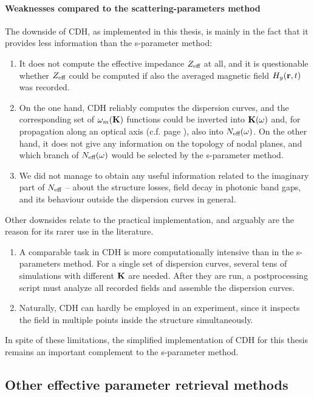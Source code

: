 \paragraph{Weaknesses compared to the scattering-parameters method}%
The downside of CDH, as implemented in this thesis, is mainly in the fact that it provides less information than the s-parameter method: 
\begin{enumerate}
\item{It does not compute the effective impedance $Z_{\text{eff} }$ at all, and it is questionable whether $Z_{\text{eff} }$ could be computed if also the averaged magnetic field $H_y({\mathbf{r}}, t)$ was recorded. } 
\item{On the one hand, CDH reliably computes the dispersion curves, and the corresponding set of $\omega_m({\mathbf{K}})$ functions could be inverted into ${\mathbf{K}}(\omega)$ and, for propagation along an optical axis (c.f. page \pageref{indexofrefraction}), also into $N_{\text{eff} }(\omega)$. On the other hand, it does not give any information on the topology of nodal planes, and which branch of $N_{\text{eff} }(\omega)$ would be selected by the s-parameter method. } 
\item{We did not manage to obtain any useful information related to the imaginary part of $N_{\text{eff} }$ -- about the structure losses, field decay in photonic band gaps, and its behaviour outside the dispersion curves in general.}
\end{enumerate}
Other downsides relate to the practical implementation, and arguably are the reason for its rarer use in the literature.
\begin{enumerate}
\item{A comparable task in CDH is more computationally intensive than in the s-parameters method. For a single set of dispersion curves, several tens of simulations with different ${\mathbf{K}}$ are needed. After they are run, a postprocessing script must analyze all recorded fields and assemble the dispersion curves. }
\item{Naturally, CDH can hardly be employed in an experiment, since it inspects the field in multiple points inside the structure simultaneously. }
\end{enumerate}
In spite of these limitations, the simplified implementation of CDH for this thesis remains an important complement to the s-parameter method. 


\subsection{Other effective parameter retrieval methods}      %
